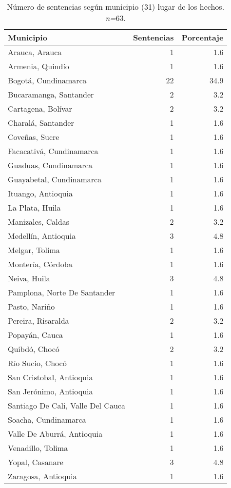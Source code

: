\begin{table}[!htbp]
\centering
\caption{Número de sentencias según municipio (31) lugar de los hechos. \textit{n=}63.} 
\label{tab:munhec}
\begin{tabular}{lrr}
  \hline
Municipio & Sentencias & Porcentaje \\ 
  \hline
Arauca, Arauca &  1 & 1.6 \\ 
  Armenia, Quindío &  1 & 1.6 \\ 
  Bogotá, Cundinamarca & 22 & 34.9 \\ 
  Bucaramanga, Santander &  2 & 3.2 \\ 
  Cartagena, Bolívar &  2 & 3.2 \\ 
  Charalá, Santander &  1 & 1.6 \\ 
  Coveñas, Sucre &  1 & 1.6 \\ 
  Facacativá, Cundinamarca &  1 & 1.6 \\ 
  Guaduas, Cundinamarca &  1 & 1.6 \\ 
  Guayabetal, Cundinamarca &  1 & 1.6 \\ 
  Ituango, Antioquia &  1 & 1.6 \\ 
  La Plata, Huila &  1 & 1.6 \\ 
  Manizales, Caldas &  2 & 3.2 \\ 
  Medellín, Antioquia &  3 & 4.8 \\ 
  Melgar, Tolima &  1 & 1.6 \\ 
  Montería, Córdoba &  1 & 1.6 \\ 
  Neiva, Huila &  3 & 4.8 \\ 
  Pamplona, Norte De Santander &  1 & 1.6 \\ 
  Pasto, Nariño &  1 & 1.6 \\ 
  Pereira, Risaralda &  2 & 3.2 \\ 
  Popayán, Cauca &  1 & 1.6 \\ 
  Quibdó, Chocó &  2 & 3.2 \\ 
  Río Sucio, Chocó &  1 & 1.6 \\ 
  San Cristobal, Antioquia &  1 & 1.6 \\ 
  San Jerónimo, Antioquia &  1 & 1.6 \\ 
  Santiago De Cali, Valle Del Cauca &  1 & 1.6 \\ 
  Soacha, Cundinamarca &  1 & 1.6 \\ 
  Valle De Aburrá, Antioquia &  1 & 1.6 \\ 
  Venadillo, Tolima &  1 & 1.6 \\ 
  Yopal, Casanare &  3 & 4.8 \\ 
  Zaragosa, Antioquia &  1 & 1.6 \\ 
   \hline
\end{tabular}
\end{table}
